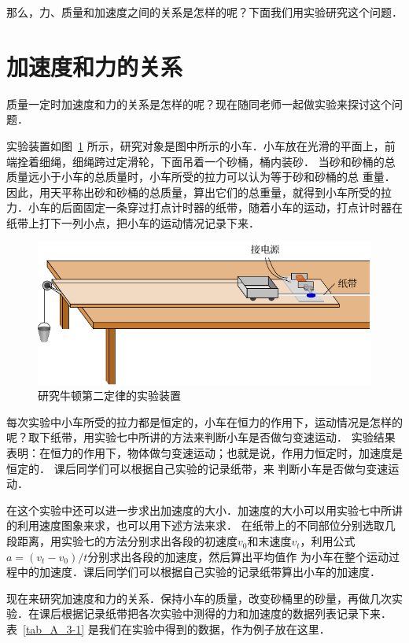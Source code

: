 那么，力、质量和加速度之间的关系是怎样的呢？下面我们用实验研究这个问题．


\section{加速度和力的关系}
质量一定时加速度和力的关系是怎样的呢？现在随同老师一起做实验来探讨这个问题．

实验装置如图~\ref{fig_A_3-3} 所示，研究对象是图中所示的小车．小车放在光滑的平面上，前端拴着细绳，细绳跨过定滑轮，下面吊着一个砂桶，桶内装砂．
当砂和砂桶的总质量远小于小车的总质量时，小车所受的拉力可以认为等于砂和砂桶的总
重量．因此，用天平称出砂和砂桶的总质量，算出它们的总重量，就得到小车所受的拉力．小车的后面固定一条穿过打点计时器的纸带，随着小车的运动，打点计时器在纸带上打下一列小点，把小车的运动情况记录下来．

\begin{figure}[htp]
    \centering
    \includegraphics{fig/A/3-3.pdf}
    \caption{研究牛顿第二定律的实验装置}\label{fig_A_3-3}
\end{figure}

每次实验中小车所受的拉力都是恒定的，小车在恒力的作用下，运动情况是怎样的呢？取下纸带，用实验七中所讲的方法来判断小车是否做匀变速运动．
实验结果表明：在恒力的作用下，物体做匀变速运动；也就是说，作用力恒定时，加速度是恒定的．
课后同学们可以根据自己实验的记录纸带，来
判断小车是否做匀变速运动．

在这个实验中还可以进一步求出加速度的大小．加速度的大小可以用实验七中所讲的利用速度图象来求，也可以用下述方法来求．
在纸带上的不同部位分别选取几段距离，用实验七的方法分别求出各段的初速度$v_0$和末速度$v_t$，利用公式$a=(v_t-v_0)/t$分别求出各段的加速度，然后算出平均值作
为小车在整个运动过程中的加速度．课后同学们可以根据自己实验的记录纸带算出小车的加速度．

现在来研究加速度和力的关系．保持小车的质量，改变砂桶里的砂量，再做几次实验．在课后根据记录纸带把各次实验中测得的力和加速度的数据列表记录下来．
表~\ref{tab_A_3-1} 是我们在实验中得到的数据，作为例子放在这里．


